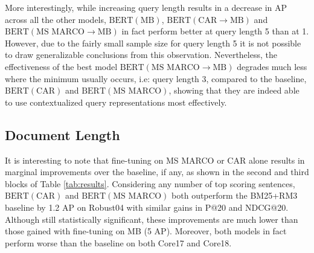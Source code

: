 More interestingly, while increasing query length results in a decrease in AP across all the other models, $ \textrm{BERT}(\textrm{MB}) $, $ \textrm{BERT}(\textrm{CAR}\rightarrow\textrm{MB}) $ and $ \textrm{BERT}(\textrm{MS MARCO}\rightarrow\textrm{MB}) $ in fact perform better at query length 5 than at 1.
However, due to the fairly small sample size for query length 5 it is not possible to draw generalizable conclusions from this observation.
Nevertheless, the effectiveness of the best model  $ \textrm{BERT}(\textrm{MS MARCO}\rightarrow\textrm{MB}) $ degrades much less where the minimum usually occurs, i.e: query length 3, compared to the baseline, $ \textrm{BERT}(\textrm{CAR}) $ and $ \textrm{BERT}(\textrm{MS MARCO}) $, showing that they are indeed able to use contextualized query representations most effectively.

\subsection{Document Length}

\begin{table*}[t!]
\centering{}
\caption{Ranking effectiveness on shortened MS MARCO and CAR evaluated on Robust04.}
\label{tab:results-chopped}
\end{table*}

It is interesting to note that fine-tuning on MS MARCO or CAR alone results in marginal improvements over the baseline, if any, as shown in the second and third blocks of Table \ref{tab:results}.
Considering any number of top scoring sentences, $ \textrm{BERT}(\textrm{CAR}) $ and $ \textrm{BERT}(\textrm{MS MARCO}) $ both outperform the BM25+RM3 baseline by 1.2 AP on Robust04 with similar gains in P@20 and NDCG@20.
Although still statistically significant, these improvements are much lower than those gained with fine-tuning on MB (5 AP).
Moreover, both models in fact perform worse than the baseline on both Core17 and Core18.

